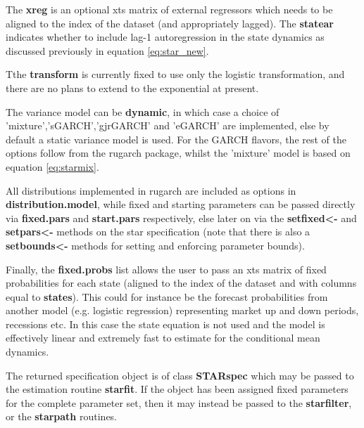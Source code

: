 The \textbf{xreg} is an optional xts matrix of external regressors which needs
to be aligned to the index of the dataset (and appropriately lagged). The
\textbf{statear} indicates whether to include lag-1 autoregression in the state
dynamics as discussed previously in equation \ref{eq:star_new}.

Tthe \textbf{transform} is currently fixed to use only the logistic
transformation, and there are no plans to extend to the exponential at present.

The variance model can be \textbf{dynamic}, in which case a choice of
'mixture','sGARCH','gjrGARCH' and 'eGARCH' are implemented, else by default a
static variance model is used. For the GARCH flavors, the rest of the options
follow from the rugarch package, whilst the 'mixture' model is based on 
equation \ref{eq:starmix}. 

All distributions implemented in rugarch are included as options in
\textbf{distribution.model}, while fixed and starting parameters can be passed
directly via \textbf{fixed.pars} and \textbf{start.pars} respectively, else
later on via the \textbf{setfixed<-} and \textbf{setpars<-} methods on the star
specification (note that there is also a \textbf{setbounds<-}  methods for
setting and enforcing parameter bounds).

Finally, the \textbf{fixed.probs} list allows the user to pass an xts matrix of 
fixed probabilities for each state (aligned to the index of the dataset and with
columns equal to \textbf{states}). This could for instance be the forecast
probabilities from another model (e.g. logistic regression) representing market
up and down periods, recessions etc. In this case the state equation is not used
and the model is effectively linear and extremely fast to estimate for
the conditional mean dynamics.

The returned specification object is of class \textbf{STARspec} which may be
passed to the estimation routine \textbf{starfit}. If the object has been
assigned fixed parameters for the complete parameter set, then it may instead be
passed to the \textbf{starfilter},  or the \textbf{starpath}
routines.

